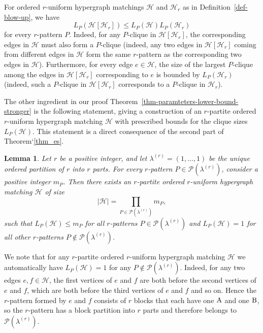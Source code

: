 \documentclass{aic}
\newtheorem{lemma}[theorem]{Lemma}
\theoremstyle{definition}
\numberwithin{equation}{section}
\numberwithin{figure}{section}
\newcommand{\HH}{\mathcal{H}}
\newcommand{\PP}{\mathcal{P}}
\begin{document}
For ordered $r$-uniform hypergraph matchings $\HH$ and $\HH_r$ as in Definition~\ref{def-blow-up}, we have
\begin{equation}\label{Lp}
L_P(\HH[\HH_r]) \le L_P(\HH) L_P(\HH_r)
\end{equation}
for every $r$-pattern $P$. Indeed, for any $P$-clique in $\HH[\HH_r]$, the corresponding edges in $\HH$ must also form a $P$-clique (indeed, any two edges in $\HH[\HH_r]$ coming from different edges in $\HH$ form the same $r$-pattern as the corresponding two edges in $\HH$). Furthermore, for every edge $e\in \HH$, the size of the largest $P$-clique among the edges in $\HH[\HH_r]$ corresponding to $e$ is bounded by $L_P(\HH_r)$ (indeed, such a $P$-clique in $\HH[\HH_r]$ corresponds to a $P$-clique in $\HH_r$).

The other ingredient in our proof Theorem~\ref{thm-paramteters-lower-bound-stronger} is the following statement, giving a construction of an $r$-partite ordered $r$-uniform hypergraph matching $\HH$ with prescribed bounds for the clique sizes $L_P(\HH)$. This statement is a direct consequence of the second part of Theorem`\ref{thm_es}.

\begin{lemma}\label{obs-construction-partite}
    Let $r$ be a positive integer, and let $\lambda^{(r)}=(1,\dots,1)$ be the unique ordered partition of $r$ into $r$ parts. For every $r$-pattern $P\in \PP(\lambda^{(r)})$, consider a positive integer $m_P$. Then there exists an $r$-partite ordered $r$-uniform hypergraph matching $\HH$ of size
\[|\HH|=\prod_{P\in \PP(\lambda^{(r)})} m_{P},\]
such that $L_P(\HH)\le m_P$ for all $r$-patterns $P\in \PP(\lambda^{(r)})$ and $L_P(\HH)=1$ for all other $r$-patterns $P\not\in \PP(\lambda^{(r)})$.
\end{lemma}

We note that for any $r$-partite ordered $r$-uniform hypergraph matching $\HH$ we automatically have $L_{P}(\HH)=1$ for any $P\not\in \PP(\lambda^{(r)})$. Indeed, for any two edges $e,f\in \HH$, the first vertices of $e$ and $f$ are both before the second vertices of $e$ and $f$, which are both before the third vertices of $e$ and $f$ and so on. Hence the $r$-pattern formed by $e$ and $f$ consists of $r$ blocks that each have one $\rm A$ and one $\rm B$, so the $r$-pattern has a block partition into $r$ parts and therefore belongs to $\PP(\lambda^{(r)})$.
\end{document}
